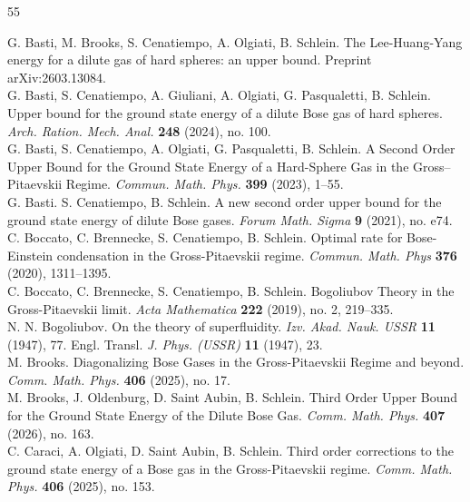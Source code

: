 \documentclass[a4paper,11pt]{article}
\numberwithin{equation}{section}
\def\bskip{\\[-0.6cm]}
\begin{document}
\begin{thebibliography}{55}

\def\bibskip{\\[-0.6cm]}

 G. Basti, M. Brooks, S. Cenatiempo, A. Olgiati, B. Schlein. The Lee-Huang-Yang energy for a dilute gas of hard spheres: an upper bound. Preprint arXiv:2603.13084. \bibskip


 G. Basti, S. Cenatiempo, A. Giuliani, A. Olgiati, G. Pasqualetti, B. Schlein. Upper bound for the ground state energy of a dilute Bose gas of hard spheres.
{\it Arch. Ration. Mech. Anal.} {\bf 248} (2024), no. 100. \bibskip

 G. Basti, S. Cenatiempo, A. Olgiati, G. Pasqualetti, B. Schlein. A Second Order Upper Bound for the Ground State Energy of a Hard-Sphere Gas in the Gross–Pitaevskii Regime. {\it Commun. Math. Phys.} \textbf{399} (2023), 1–55. \bibskip

G. Basti. S. Cenatiempo, B. Schlein. A new second order upper bound for the ground state energy of dilute Bose gases. {\it Forum Math. Sigma} {\bf 9} (2021), no. e74. \bibskip

C. Boccato, C. Brennecke, S. Cenatiempo, B. Schlein. Optimal rate for Bose-Einstein condensation in the Gross-Pitaevskii regime. {\it Commun. Math. Phys} {\bf 376} (2020), 1311--1395. \bibskip

C. Boccato, C. Brennecke, S. Cenatiempo, B. Schlein. Bogoliubov Theory in the Gross-Pitaevskii limit. {\it Acta Mathematica} {\bf 222} (2019), no. 2, 219--335. \bibskip

N. N. Bogoliubov. On the theory of superfluidity.
{\it Izv. Akad. Nauk. USSR} {\bf 11} (1947), 77. Engl. Transl. {\it J. Phys. (USSR)} {\bf 11} (1947), 23. \bskip

 M. Brooks. Diagonalizing Bose Gases in the Gross-Pitaevskii Regime and  beyond. {\it Comm. Math. Phys.} {\bf 406} (2025), no. 17. \bibskip

M. Brooks, J. Oldenburg, D. Saint Aubin, B. Schlein. Third Order Upper Bound for the Ground State Energy of the Dilute Bose Gas. {\it Comm. Math. Phys.} {\bf 407} (2026), no. 163. \bibskip

C. Caraci, A. Olgiati, D. Saint Aubin, B. Schlein. Third order corrections to the ground state energy of a Bose gas in the Gross-Pitaevskii regime. {\it Comm. Math. Phys.}  {\bf 406} (2025), no. 153.  \bibskip


\end{thebibliography}
\end{document}
